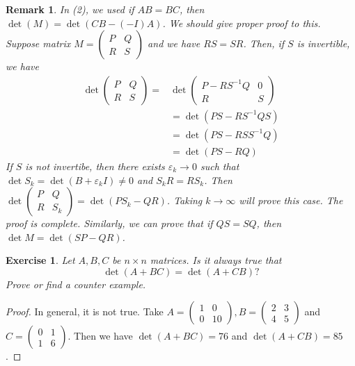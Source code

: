 \documentclass[11pt]{book}
\newtheorem{exercise}{Exercise}[section]
\newtheorem{remark}{Remark}[section]
\theoremstyle{definition}
\numberwithin{equation}{subsection}
\begin{document}
\begin{remark}
In (2), we used if $AB=BC$, then $\det(M)=\det(CB-(-I)A)$. We should give proper proof to this. Suppose matrix $M = \begin{pmatrix}
P & Q \\
R & S
\end{pmatrix}$ and we have $RS=SR$. Then, if $S$ is invertible, we have 
\begin{align*}
    \det \begin{pmatrix}
    P & Q \\
    R & S
    \end{pmatrix}
    = &\det 
    \begin{pmatrix}
    P-RS^{-1}Q & 0 \\
    R & S
    \end{pmatrix} \\
    & = \det(PS-RS^{-1}QS) \\
    & = \det(PS-RSS^{-1}Q) \\
    & = \det(PS-RQ)
\end{align*}
If $S$ is not invertibe, then there exists $\varepsilon_k \rightarrow 0$ such that $\det S_k = \det(B+\varepsilon_k I) \neq 0$ and $S_k R = R S_k$. Then $\det \begin{pmatrix}
P & Q \\
R & S_k
\end{pmatrix} = \det (PS_k-QR)$. Taking $k\rightarrow \infty$ will prove this case. The proof is complete. Similarly, we can prove that if $QS=SQ$, then $\det M = \det(SP-QR)$.
\end{remark}

\medskip

\begin{exercise}
Let $A,B,C$ be $n\times n$ matrices. Is it always true that
$$
\det\left(  A+BC\right)  =\det\left(  A+CB\right)  ?
$$
Prove or find a counter example.
\end{exercise}
\begin{proof}
In general, it is not true. Take $A = \begin{pmatrix}
    1 & 0 \\
    0 & 10
    \end{pmatrix},
    B = 
    \begin{pmatrix}
    2 & 3 \\
    4 & 5
    \end{pmatrix}$
and $C = \begin{pmatrix}
    0 & 1 \\
    1 & 6
    \end{pmatrix}$.
Then we have $\det(A+BC) = 76$ and $\det(A+CB) = 85$.
\end{proof}
\end{document}
